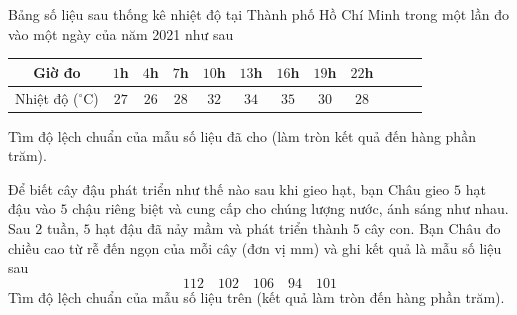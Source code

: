 \begin{ex}%
	Bảng số liệu sau thống kê nhiệt độ tại Thành phố Hồ Chí Minh trong một lần đo vào một ngày của năm 2021 như sau
	\begin{center}
		\begin{tabular}{|c|c|c|c|c|c|c|c|c|c|c|c}
			\hline Giờ đo & $1$h & $4$h & $7$h & $10$h & $13$h & $16$h & $19$h & $22$h   \\
			\hline Nhiệt độ ($^\circ \mathrm{C}$) & $27$ & $26$ & $28$ & $32$ & $34$ & $35$ & $30$ & $28$  \\
			\hline 
		\end{tabular}
	\end{center}
	Tìm độ lệch chuẩn của mẫu số liệu đã cho (làm tròn kết quả đến hàng phần trăm).
\end{ex}

\begin{ex}%
	Để biết cây đậu phát triển như thế nào sau khi gieo hạt, bạn Châu gieo $5$ hạt đậu vào $5$ chậu riêng biệt và cung cấp cho chúng lượng nước, ánh sáng như nhau. Sau $2$ tuần, $5$ hạt đậu đã nảy mầm và phát triển thành $5$ cây con. Bạn Châu đo chiều cao từ rễ đến ngọn của mỗi cây (đơn vị mm) và ghi kết quả là mẫu số liệu sau
	\[ 112 \quad 102 \quad 106 \quad 94 \quad 101 \]
	Tìm độ lệch chuẩn của mẫu số liệu trên (kết quả làm tròn đến hàng phần trăm).
\end{ex}

